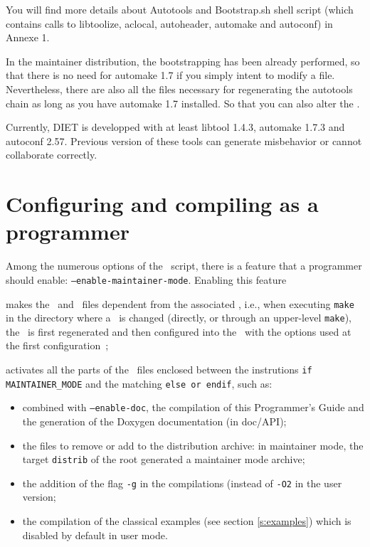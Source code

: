 
You will find more details about Autotools and Bootstrap.sh shell
script  (which contains calls to libtoolize, aclocal, autoheader,
automake and  autoconf) in Annexe 1.


\noindent
{} In the maintainer distribution, the bootstrapping
has been already performed, so that there is no need for
\textsf{automake 1.7} if you simply intent to modify a
file. Nevertheless, there are also all the files necessary for
regenerating the autotools chain as long as you have \textsf{automake
1.7} installed. So that you can also alter the \makeam.

\noindent
{} Currently, DIET is developped with at least libtool
1.4.3, automake 1.7.3 and autoconf 2.57. Previous version of these
tools can generate misbehavior or cannot collaborate correctly.

\section{Configuring and compiling as a programmer}

Among the numerous options of the \configure\ script, there is a
feature that a programmer should enable:
\texttt{--enable-maintainer-mode}. Enabling this feature
\begin{description}
\item{}makes the \make\ and \makein\ files dependent from the
    associated \makeam, i.e., when executing \texttt{make} in the
    directory where a \makeam\ is changed (directly, or through an
    upper-level \texttt{make}), the \makein\ is first regenerated and
    then configured into the \make\ with the options used at the first
    configuration~;
\item{}activates all the parts of the \makeam\ files enclosed between
    the instrutions \texttt{\footnotesize if MAINTAINER\_MODE} and the
    matching \texttt{\footnotesize else or endif}, such as:
    \begin{itemize}
    \item{combined with \texttt{--enable-doc}, the compilation of this
        Programmer's Guide and the generation of the Doxygen
        documentation (in doc/API);}
    \item{the files to remove or add to the distribution archive: in
        maintainer mode, the target \texttt{distrib} of the root \make
        generated a maintainer mode archive;}
    \item{the addition of the flag \texttt{-g} in the compilations
        (instead of \texttt{-O2} in the user version;}
    \item{the compilation of the classical examples (see section
        \ref{s:examples}) which is disabled by default in user mode.}
    \end{itemize}
\end{description}


